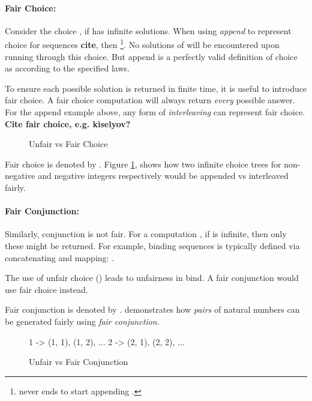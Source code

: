 \paragraph{Fair Choice:} Consider the choice , if  has infinite solutions. When using \textit{append} to represent choice for sequences \textbf{cite}, then \footnote{ never ends to start appending .}. No solutions of  will be encountered upon running through this choice. But append is a perfectly valid definition of choice as according to the specified laws.

To ensure each possible solution is returned in finite time, it is useful to introduce fair choice. A fair choice computation will always return \textit{every} possible answer. For the append example above, any form of \textit{interleaving} can represent fair choice. \textbf{Cite fair choice, e.g. kiselyov?}

\begin{figure}

\caption{Unfair vs Fair Choice}
\label{fig:FairChoice}
\end{figure}

Fair choice is denoted by \code{<|>}. Figure \cref{fig:FairChoice}, shows how two infinite choice trees for non-negative and negative integers respectively would be appended vs interleaved fairly.

\paragraph{Fair Conjunction:} 
Similarly, conjunction is not fair. For a computation , if  is infinite, then only these might be returned. For example, binding sequences is typically defined via concatenating and mapping: . 

The use of unfair choice () leads to unfairness in bind. A fair conjunction would use fair choice instead.

Fair conjunction is denoted by \code{>>-}.  demonstrates how \textit{pairs} of natural numbers can be generated fairly using \textit{fair conjunction}.

\begin{figure}
1 -> (1, 1), (1, 2), ...
2 -> (2, 1), (2, 2), ...
\caption{Unfair vs Fair Conjunction}
\label{fig:FairConjunction}
\end{figure}

